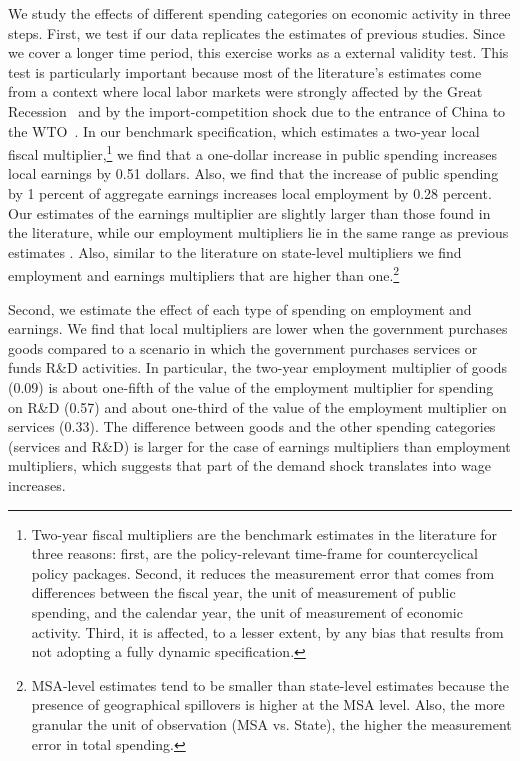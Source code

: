 \documentclass[dv_diss_main.tex]{subfiles}
\begin{document}
We study the effects of different spending categories on economic activity in three steps. First, we test if our data replicates the estimates of previous studies. Since we cover a longer time period, this exercise works as a external validity test. This test is particularly important because most of the literature's estimates come from a context where local labor markets were strongly affected by the Great Recession~\citep{yagan2019employment} and by the import-competition shock due to the entrance of China to the WTO~\citep{autor2016importing}. In our benchmark specification, which estimates a two-year local fiscal multiplier,\footnote{
Two-year fiscal multipliers are the benchmark estimates in the literature for three reasons: first, are the policy-relevant time-frame for countercyclical policy packages. Second, it reduces the measurement error that comes from differences between the fiscal year, the unit of measurement of public spending, and the calendar year, the unit of measurement of economic activity. Third, it is affected, to a lesser extent, by any bias that results from not adopting a fully dynamic specification.
} 
we find that a one-dollar increase in public spending increases local earnings by 0.51 dollars. Also, we find that the increase of public spending by 1 percent of aggregate earnings increases local employment by 0.28 percent. Our estimates of the earnings multiplier are slightly larger than those found in the literature, while our employment multipliers lie in the same range as previous estimates \citep{Auerbach2019, Demyanyk2019, suarez2016estimating}. Also, similar to the literature on state-level multipliers \citep{Nakamura2014,dupor2017local} we find employment and earnings multipliers that are higher than one.\footnote{MSA-level estimates tend to be smaller than state-level estimates because the presence of geographical spillovers is higher at the MSA level. Also, the more granular the unit of observation (MSA vs. State), the higher the measurement error in total spending.}

Second, we estimate the effect of each type of spending on employment and earnings. We find that local multipliers are lower when the government purchases goods compared to a scenario in which the government purchases services or funds R\&D activities. In particular, the two-year employment multiplier of goods (0.09) is about one-fifth of the value of the employment multiplier for spending on R\&D (0.57) and about one-third of the value of the employment multiplier on services (0.33). The difference between goods and the other spending categories (services and R&D) is larger for the case of earnings multipliers than employment multipliers, which suggests that part of the demand shock translates into wage increases.   
\end{document}
